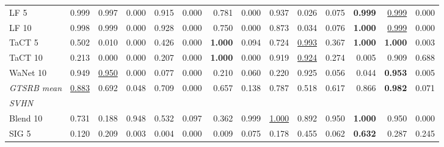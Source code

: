 \begin{table}[htbp]
\begin{adjustbox}{max width=\textwidth}
\begin{tabular}{lrrrrrrrrrrrrr}
LF 5 & 0.999 & 0.997 & \textcolor{black!45}{0.000} & 0.915 & \textcolor{black!45}{0.000} & 0.781 & \textcolor{black!45}{0.000} & 0.937 & \textcolor{black!45}{0.026} & \textcolor{black!45}{0.075} & \textbf{0.999} & \underline{0.999} & \textcolor{black!45}{0.000} \\
LF 10 & 0.998 & 0.999 & \textcolor{black!45}{0.000} & 0.928 & \textcolor{black!45}{0.000} & 0.750 & \textcolor{black!45}{0.000} & 0.873 & \textcolor{black!45}{0.034} & \textcolor{black!45}{0.076} & \textbf{1.000} & \underline{0.999} & \textcolor{black!45}{0.000} \\
TaCT 5 & 0.502 & \textcolor{black!45}{0.010} & \textcolor{black!45}{0.000} & \textcolor{black!45}{0.426} & \textcolor{black!45}{0.000} & \textbf{1.000} & \textcolor{black!45}{0.094} & 0.724 & \underline{0.993} & \textcolor{black!45}{0.367} & \textbf{1.000} & \textbf{1.000} & \textcolor{black!45}{0.003} \\
TaCT 10 & \textcolor{black!45}{0.213} & \textcolor{black!45}{0.000} & \textcolor{black!45}{0.000} & \textcolor{black!45}{0.207} & \textcolor{black!45}{0.000} & \textbf{1.000} & \textcolor{black!45}{0.000} & 0.919 & \underline{0.924} & \textcolor{black!45}{0.274} & \textcolor{black!45}{0.005} & 0.909 & 0.688 \\
WaNet 10 & 0.949 & \underline{0.950} & \textcolor{black!45}{0.000} & \textcolor{black!45}{0.077} & \textcolor{black!45}{0.000} & \textcolor{black!45}{0.210} & \textcolor{black!45}{0.060} & \textcolor{black!45}{0.220} & 0.925 & \textcolor{black!45}{0.056} & \textcolor{black!45}{0.044} & \textbf{0.953} & \textcolor{black!45}{0.005} \\
\rowcolor{black!8}\emph{GTSRB mean} & \underline{0.883} & 0.692 & \textcolor{black!45}{0.048} & 0.709 & \textcolor{black!45}{0.000} & 0.657 & \textcolor{black!45}{0.138} & 0.787 & 0.518 & 0.617 & 0.866 & \textbf{0.982} & \textcolor{black!45}{0.071} \\
\multicolumn{14}{l}{\emph{SVHN}} \\
Blend 10 & 0.731 & \textcolor{black!45}{0.188} & 0.948 & 0.532 & \textcolor{black!45}{0.097} & \textcolor{black!45}{0.362} & 0.999 & \underline{1.000} & 0.892 & 0.950 & \textbf{1.000} & 0.950 & \textcolor{black!45}{0.000} \\
SIG 5 & \textcolor{black!45}{0.120} & \textcolor{black!45}{0.209} & \textcolor{black!45}{0.003} & \textcolor{black!45}{0.004} & \textcolor{black!45}{0.000} & \textcolor{black!45}{0.009} & \textcolor{black!45}{0.075} & \textcolor{black!45}{0.178} & \textcolor{black!45}{0.455} & \textcolor{black!45}{0.062} & \textbf{0.632} & \textcolor{black!45}{0.287} & \textcolor{black!45}{0.245} \\

\end{tabular}
\end{adjustbox}
\end{table}
